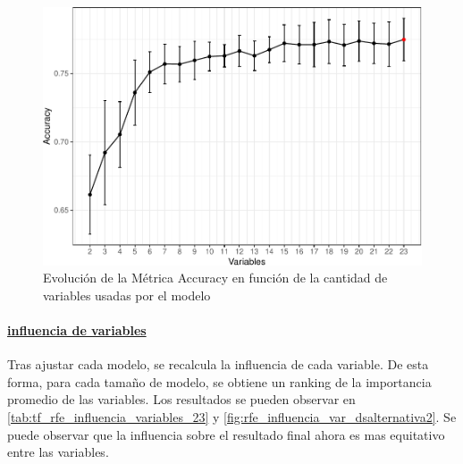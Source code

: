 \begin{figure}[!htb]
	\centering
	\includegraphics{imagenes/variables/rfe_evolucion_accuracy-1_alternativa2.pdf}
	\caption{Evolución de la Métrica Accuracy en función de la cantidad de variables usadas por el modelo}
	\label{fig:rfe_evolucion_accuracy_datasetAlternativa2}
\end{figure}

\paragraph{\underline{influencia de variables}}
Tras ajustar cada modelo, se recalcula la influencia de cada variable.
De esta forma, para cada tamaño de modelo, se obtiene un ranking de la
importancia promedio de las variables. Los resultados se pueden observar en \ref{tab:tf_rfe_influencia_variables_23} y \ref{fig:rfe_influencia_var_dsalternativa2}. Se puede observar que la influencia sobre el resultado final ahora es mas equitativo entre las variables.


